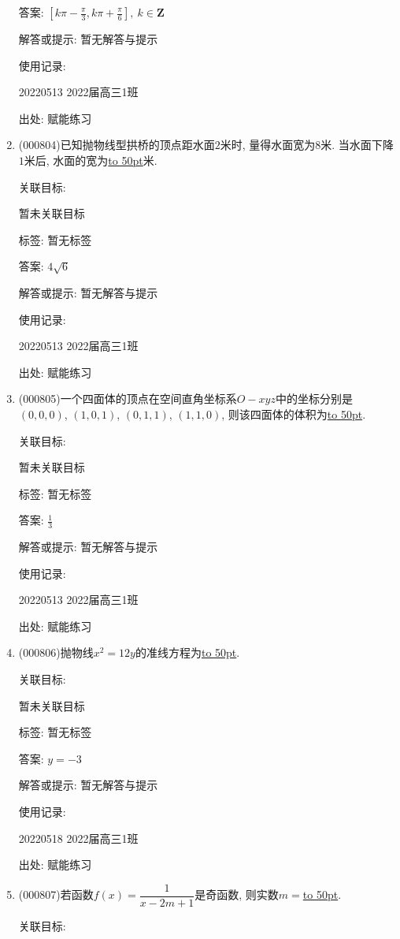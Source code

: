 \documentclass[10pt,a4paper]{article}
\newcommand{\blank}[1]{\underline{\hbox to #1pt{}}}
\begin{document}
\begin{enumerate}[1.]
答案: $[k\pi -\frac{\pi}3,k\pi +\frac{\pi}6 ], \ k\in \mathbf{Z}$

解答或提示: 暂无解答与提示

使用记录:

20220513	2022届高三1班	


出处: 赋能练习
\item { (000804)}已知抛物线型拱桥的顶点距水面$2$米时, 量得水面宽为$8$米. 当水面下降$1$米后, 水面的宽为\blank{50}米.


关联目标:

暂未关联目标



标签: 暂无标签

答案: $4\sqrt 6$

解答或提示: 暂无解答与提示

使用记录:

20220513	2022届高三1班	


出处: 赋能练习
\item { (000805)}一个四面体的顶点在空间直角坐标系$O-xyz$中的坐标分别是$(0,0,0)$, $(1,0,1)$, $(0,1,1)$, $(1,1,0)$, 则该四面体的体积为\blank{50}.


关联目标:

暂未关联目标



标签: 暂无标签

答案: $\frac 13$

解答或提示: 暂无解答与提示

使用记录:

20220513	2022届高三1班	


出处: 赋能练习
\item { (000806)}抛物线$x^2=12y$的准线方程为\blank{50}.


关联目标:

暂未关联目标



标签: 暂无标签

答案: $y=-3$

解答或提示: 暂无解答与提示

使用记录:

20220518	2022届高三1班	


出处: 赋能练习
\item { (000807)}若函数$f(x)=\dfrac1{x-2m+1}$是奇函数, 则实数$m=$\blank{50}.


关联目标:


\end{enumerate}
\end{document}
